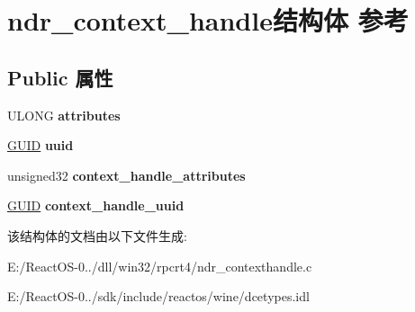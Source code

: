 \hypertarget{structndr__context__handle}{}\section{ndr\+\_\+context\+\_\+handle结构体 参考}
\label{structndr__context__handle}
\subsection*{Public 属性}
\begin{DoxyCompactItemize}
\item 
\mbox{\label{structndr__context__handle_a1e18d72fc79e7f3e8421906c30f7dec4}} 
U\+L\+O\+NG {\bfseries attributes}
\item 
\mbox{\label{structndr__context__handle_a0af6b251f427871120e42551bd87ec9d}} 
\hyperlink{interface_g_u_i_d}{G\+U\+ID} {\bfseries uuid}
\item 
\mbox{\label{structndr__context__handle_a5f260a221ae478c8e5520098492f681f}} 
unsigned32 {\bfseries context\+\_\+handle\+\_\+attributes}
\item 
\mbox{\label{structndr__context__handle_ab92b9018a5d8d10b07573b379d84ca81}} 
\hyperlink{interface_g_u_i_d}{G\+U\+ID} {\bfseries context\+\_\+handle\+\_\+uuid}
\end{DoxyCompactItemize}


该结构体的文档由以下文件生成\+:\begin{DoxyCompactItemize}
\item 
E\+:/\+React\+O\+S-\/0../dll/win32/rpcrt4/ndr\+\_\+contexthandle.\+c\item 
E\+:/\+React\+O\+S-\/0../sdk/include/reactos/wine/dcetypes.\+idl\end{DoxyCompactItemize}
